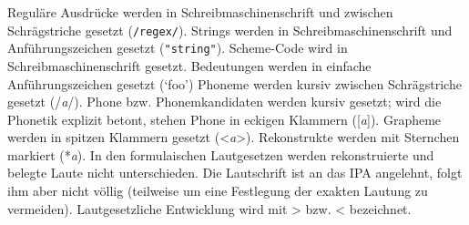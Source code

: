 \documentclass[12pt,a4paper,normalheadings,bibliography=totoc]{scrartcl}
\def\rek#1{\mbox{*\textit{#1}}}
\def\i#1{\mbox{\textit{#1}}}
\def\rx#1{\texttt{/#1/}}
\def\str#1{\texttt{"#1"}}
\begin{document}
Reguläre Ausdrücke werden in Schreibmaschinenschrift und zwischen
Schrägstriche gesetzt (\rx{regex}).
Strings werden in Schreibmaschinenschrift und Anführungszeichen gesetzt
(\str{string}).
Scheme-Code wird in Schreibmaschinenschrift gesetzt.
Bedeutungen werden in einfache Anführungszeichen gesetzt (`foo')
Phoneme werden kursiv zwischen Schrägstriche gesetzt (/\i{a}/).
Phone bzw. Phonemkandidaten werden kursiv gesetzt;
wird die Phonetik explizit betont, stehen Phone in eckigen Klammern ([\i{a}]).
Grapheme werden in spitzen Klammern gesetzt (<\i{a}>).
Rekonstrukte werden mit Sternchen markiert (\rek{a}).
In den formulaischen Lautgesetzen werden rekonstruierte
und belegte Laute nicht unterschieden.
Die Lautschrift ist an das IPA angelehnt,
folgt ihm aber nicht völlig
(teilweise um eine Festlegung der exakten Lautung zu vermeiden).
Lautgesetzliche Entwicklung wird mit > bzw. < bezeichnet.
\end{document}
